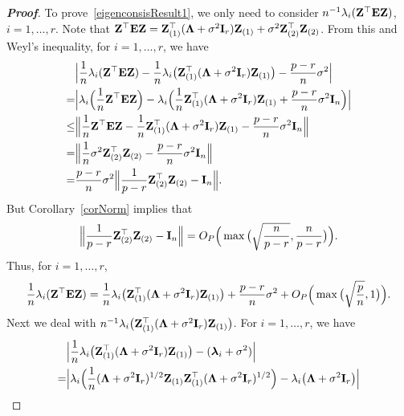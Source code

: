 \documentclass[times,sort&compress,3p]{elsarticle}
\newcommand{\bZ}{\mathbf{Z}}
\newcommand{\bfsym}[1]{\ensuremath{\boldsymbol{#1}}}
\def\blambda {\bfsym {\lambda}}        \def\bLambda {\bfsym {\Lambda}}
\theoremstyle{plain}
\theoremstyle{definition}
\theoremstyle{remark}
\begin{document}
\begin{appendices}
\begin{proof}[\textbf{Proof}]
    To prove~\eqref{eigenconsisResult1}, we only need to consider $n^{-1}\lambda_i(\bZ^\top  \BE \bZ)$, $i=1,\ldots, r$.
Note that
$
    \bZ^\top  \BE \bZ= \bZ_{(1)}^\top  (\bLambda +\sigma^2 \BI_r) \bZ_{(1)}+
\sigma^2 \bZ_{(2)}^\top   \bZ_{(2)}
$.
From this and Weyl's inequality, 
for $i=1,\ldots, r$, we have 
$$
    \begin{aligned}
        &\Big|\frac{1}{n}\lambda_i(\BZ^\top  \BE \BZ)
    -\frac{1}{n}\lambda_i\big(\BZ_{(1)}^\top  (\bLambda+\sigma^2 \BI_r)\BZ_{(1)}\big)
    -\frac{p-r}{n}\sigma^2
    \Big|
        \\
        =&\Big|\lambda_i\Big(\frac{1}{n}\BZ^\top  \BE \BZ\Big)
        -\lambda_i\Big(\frac{1}{n}\BZ_{(1)}^\top  (\bLambda+\sigma^2 \BI_r)\BZ_{(1)}+\frac{p-r}{n}\sigma^2 \BI_{n}\Big)
    \Big|
        \\
        \leq &
        \Big\|\frac{1}{n}\BZ^\top  \BE \BZ
    -\frac{1}{n}\BZ_{(1)}^\top  (\bLambda+\sigma^2 \BI_r)\BZ_{(1)}
        -\frac{p-r}{n}\sigma^2\BI_{n}
        \Big\|
        \\
        = &
        \Big\|
        \frac{1}{n}\sigma^2 \bZ_{(2)}^\top   \bZ_{(2)}
        -\frac{p-r}{n}\sigma^2\BI_{n}
        \Big\|
        \\
        = &
        \frac{p-r}{n}
\sigma^2
        \Big\|
        \frac{1}{p-r}
         \bZ_{(2)}^\top   \bZ_{(2)}
        -\BI_{n}
        \Big\|.
    \end{aligned}
$$
    But Corollary~\ref{corNorm} implies that
    $$
        \Big\|
        \frac{1}{p-r}
         \bZ_{(2)}^\top   \bZ_{(2)}
        -\BI_{n}
        \Big\|=O_P\Big(\max\big(\sqrt{\frac{n}{p-r}},\frac{n}{p-r}\big)\Big).
    $$
    Thus, for $i=1,\ldots,r$,
\begin{equation}\label{toutengjiayou1}
\frac{1}{n}\lambda_i(\BZ^\top  \BE \BZ)
=\frac{1}{n}\lambda_i\big(\BZ_{(1)}^\top  (\bLambda+\sigma^2 \BI_r)\BZ_{(1)}\big)
+\frac{p-r}{n}\sigma^2
+
O_P\Big(\max\big(\sqrt{\frac{p}{n}},1\big)\Big).
\end{equation}
    Next we deal with $n^{-1}\lambda_i\big(\BZ_{(1)}^\top  (\bLambda+\sigma^2 \BI_r)\BZ_{(1)}\big)$.
    For $i=1,\ldots, r$, we have
$$
    \begin{aligned}
        &\Big|\frac{1}{n}\lambda_i \big(\bZ_{(1)}^\top (\bLambda+\sigma^2 \BI_r)\bZ_{(1)}\big)-(\blambda_i +\sigma^2)\Big|\\
        =&
        \Big|\lambda_i \Big(\frac{1}{n}(\bLambda+\sigma^2 \BI_r)^{1/2}\bZ_{(1)}\bZ_{(1)}^\top (\bLambda+\sigma^2 \BI_r)^{1/2}\Big)
        -\lambda_i\big(\bLambda+\sigma^2 \BI_r\big)\Big|\\

\end{aligned}$$
\end{proof}
\end{appendices}
\end{document}
